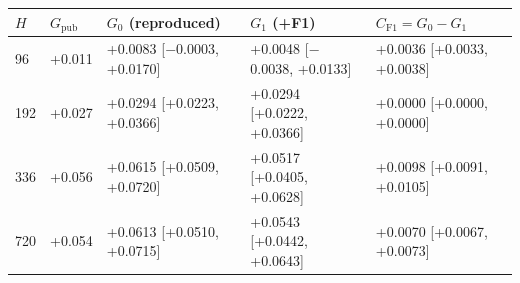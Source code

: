 \begin{tabular}{@{}lllll@{}}
\toprule
$H$ & $G_{\text{pub}}$ & $G_0$ (reproduced) & $G_1$ (+F1) & $C_{\text{F1}} = G_0 - G_1$ \\
\midrule
96 & +0.011 & +0.0083 [$-$0.0003, +0.0170] & +0.0048 [$-$0.0038, +0.0133] & +0.0036 [+0.0033, +0.0038] \\
192 & +0.027 & +0.0294 [+0.0223, +0.0366] & +0.0294 [+0.0222, +0.0366] & +0.0000 [+0.0000, +0.0000] \\
336 & +0.056 & +0.0615 [+0.0509, +0.0720] & +0.0517 [+0.0405, +0.0628] & +0.0098 [+0.0091, +0.0105] \\
720 & +0.054 & +0.0613 [+0.0510, +0.0715] & +0.0543 [+0.0442, +0.0643] & +0.0070 [+0.0067, +0.0073] \\
\bottomrule
\end{tabular}